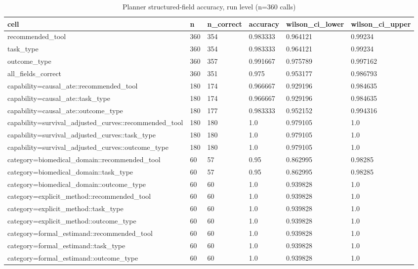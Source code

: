 \begin{table}[ht]
\centering
\caption{Planner structured-field accuracy, run level (n=360 calls)}
\label{tab:planner_structured_field_accuracy}
\begin{tabular}{llllll}
\toprule
cell & n & n\_correct & accuracy & wilson\_ci\_lower & wilson\_ci\_upper \\
\midrule
recommended\_tool & 360 & 354 & 0.983333 & 0.964121 & 0.99234 \\
task\_type & 360 & 354 & 0.983333 & 0.964121 & 0.99234 \\
outcome\_type & 360 & 357 & 0.991667 & 0.975789 & 0.997162 \\
all\_fields\_correct & 360 & 351 & 0.975 & 0.953177 & 0.986793 \\
capability=causal\_ate::recommended\_tool & 180 & 174 & 0.966667 & 0.929196 & 0.984635 \\
capability=causal\_ate::task\_type & 180 & 174 & 0.966667 & 0.929196 & 0.984635 \\
capability=causal\_ate::outcome\_type & 180 & 177 & 0.983333 & 0.952152 & 0.994316 \\
capability=survival\_adjusted\_curves::recommended\_tool & 180 & 180 & 1.0 & 0.979105 & 1.0 \\
capability=survival\_adjusted\_curves::task\_type & 180 & 180 & 1.0 & 0.979105 & 1.0 \\
capability=survival\_adjusted\_curves::outcome\_type & 180 & 180 & 1.0 & 0.979105 & 1.0 \\
category=biomedical\_domain::recommended\_tool & 60 & 57 & 0.95 & 0.862995 & 0.98285 \\
category=biomedical\_domain::task\_type & 60 & 57 & 0.95 & 0.862995 & 0.98285 \\
category=biomedical\_domain::outcome\_type & 60 & 60 & 1.0 & 0.939828 & 1.0 \\
category=explicit\_method::recommended\_tool & 60 & 60 & 1.0 & 0.939828 & 1.0 \\
category=explicit\_method::task\_type & 60 & 60 & 1.0 & 0.939828 & 1.0 \\
category=explicit\_method::outcome\_type & 60 & 60 & 1.0 & 0.939828 & 1.0 \\
category=formal\_estimand::recommended\_tool & 60 & 60 & 1.0 & 0.939828 & 1.0 \\
category=formal\_estimand::task\_type & 60 & 60 & 1.0 & 0.939828 & 1.0 \\
category=formal\_estimand::outcome\_type & 60 & 60 & 1.0 & 0.939828 & 1.0 \\

\end{tabular}
\end{table}
